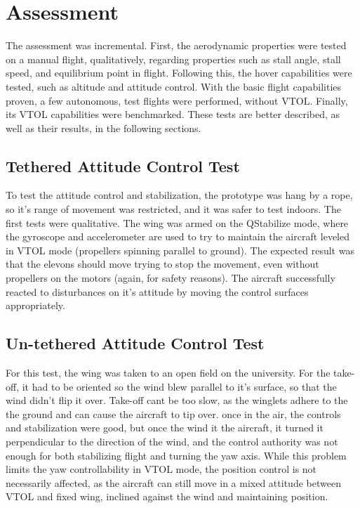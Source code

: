 \chapter{Assessment} \label{chap:assessment}

The assessment was incremental. First, the aerodynamic properties were tested on a manual flight, qualitatively, regarding properties such as stall angle, stall speed, and equilibrium point in flight. Following this, the hover capabilities were tested, such as altitude and attitude control. With the basic flight capabilities proven, a few autonomous, test flights were performed, without VTOL. Finally, its VTOL capabilities were benchmarked. These tests are better described, as well as their results, in the following sections.


\section{Tethered Attitude Control Test}

To test the attitude control and stabilization, the prototype was hang by a rope, so it's range of movement was restricted, and it was safer to test indoors.
%
The first tests were qualitative. The wing was armed on the QStabilize mode, where the gyroscope and accelerometer are used to try to maintain the aircraft leveled in VTOL mode (propellers spinning parallel to ground).
%
The expected result was that the elevons should move trying to stop the movement, even without propellers on the motors (again, for safety reasons).
%
The aircraft successfully reacted to disturbances on it's attitude by moving the control surfaces appropriately.


\section{Un-tethered Attitude Control Test} 

For this test, the wing was taken to an open field on the university.
%
For the take-off, it had to be oriented so the wind blew parallel to it's surface, so that the wind didn't flip it over.
%
Take-off cant be too slow, as the winglets adhere to the the ground and can cause the aircraft to tip over.
%
once in the air, the controls and stabilization were good, but once the wind it the aircraft, it turned it perpendicular to the direction of the wind, and the control authority was not enough for both stabilizing flight and turning the yaw axis.
%
While this problem limits the yaw controllability in VTOL mode, the position control is not necessarily affected, as the aircraft can still move in a mixed attitude between VTOL and fixed wing, inclined against the wind and maintaining position.
%

